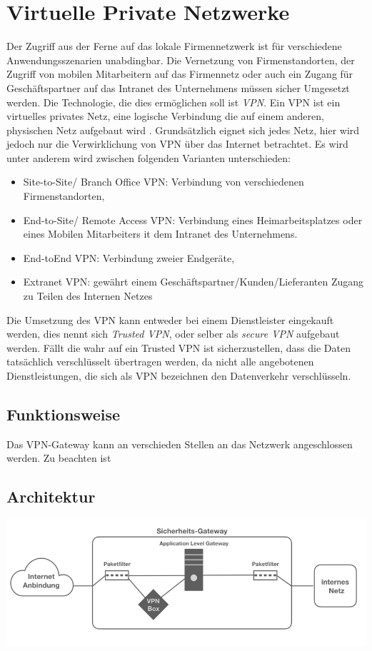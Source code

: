 \chapter{Virtuelle Private Netzwerke}

Der Zugriff aus der Ferne auf das lokale Firmennetzwerk ist für verschiedene Anwendungsszenarien unabdingbar. Die Vernetzung von Firmenstandorten, der Zugriff von mobilen Mitarbeitern auf das Firmennetz oder auch ein Zugang für Geschäftspartner auf das Intranet des Unternehmens müssen sicher Umgesetzt werden.
Die Technologie, die dies ermöglichen soll ist \emph{VPN}. Ein VPN ist ein virtuelles privates Netz, eine logische Verbindung die auf einem anderen, physischen Netz aufgebaut wird \cite{zisler2018computer}. Grundsätzlich eignet sich jedes Netz, hier wird jedoch nur die Verwirklichung von VPN über das Internet betrachtet. Es wird unter anderem wird zwischen folgenden Varianten unterschieden:
\begin{itemize}
  \item Site-to-Site/ Branch Office VPN: Verbindung von verschiedenen Firmenstandorten,
  \item End-to-Site/ Remote Access VPN: Verbindung eines Heimarbeitsplatzes oder eines Mobilen Mitarbeiters it dem Intranet des Unternehmens.
  \item End-toEnd VPN: Verbindung zweier Endgeräte,
  \item Extranet VPN: gewährt einem Geschäftspartner/Kunden/Lieferanten Zugang zu Teilen des Internen Netzes 
\end{itemize}

Die Umsetzung des VPN kann entweder bei einem Dienstleister eingekauft werden, dies nennt sich \emph{Trusted VPN}, oder selber als \emph{secure VPN} aufgebaut werden. Fällt die wahr auf ein Trusted VPN ist sicherzustellen, dass die Daten tatsächlich verschlüsselt übertragen werden, da nicht alle angebotenen Dienstleistungen, die sich als VPN bezeichnen den Datenverkehr verschlüsseln. 


\section{Funktionsweise}

Das VPN-Gateway kann an verschieden Stellen an das Netzwerk angeschlossen werden. Zu beachten ist




\section{Architektur}
\includegraphics[width=\linewidth]{vpnarchitektur.jpeg}

